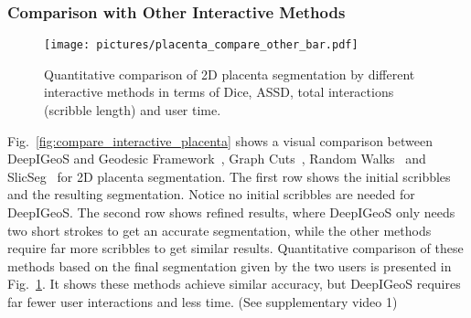 \documentclass[10pt,journal,compsoc]{IEEEtran}
\begin{document}
\subsubsection{Comparison with Other Interactive Methods}


\begin{comment}
\begin{table*}
	\centering
	\small
	\caption{Quantitative evaluation of placenta segmentation by DeepIGeoS and other interactive methods.}
	\label{tab:r-compare_interactive_placenta}
	\begin{tabular}{lllllll}
		\hline
		Method & Dice(\%) & ASSD(pixels) & Scribble(pixels) & User time(s) & Machine time(s)& Iterations\\ \hline
		DeepIGeoS & 91.16$\pm$3.17 & 1.04$\pm$0.33 & 8.33$\pm$5.26&5.31$\pm$3.44 & 0.69$\pm$0.30 & 2.06$\pm$0.64\\
		GeoS       & 86.88$\pm$4.29 & 1.54$\pm$0.49 & 133.32$\pm$46.35 & 18.00$\pm$6.64 & 0.25$\pm$0.22 & 2.65$\pm$1.25\\ 
		
		Graph Cuts        & 88.23$\pm$3.85  & 1.38$\pm$0.38 & 135.09$\pm$45.10 & 21.07$\pm$7.46 & 0.06$\pm$0.04 & 2.86$\pm$1.24\\
		Random Walks & 87.90$\pm$3.46  & 1.40$\pm$0.37 & 163.42$\pm$51.76 & 17.74$\pm$5.31 & 0.11$\pm$0.04 & 2.69$\pm$1.10\\
		SlicSeg  & 88.48$\pm$3.25 & 1.29$\pm$0.32  & 80.59$\pm$24.37 & 13.82$\pm$4.78 & 0.61$\pm$0.37 & 2.04$\pm$0.92\\  
		\hline
	\end{tabular}
\end{table*}
\end{comment}


\begin{figure}[t]
	\centering
	\texttt{[image: pictures/placenta\_compare\_other\_bar.pdf]}
	\caption[Quantitative comparison of 2D placenta segmentation by different interactive methods]{ 
		Quantitative comparison of 2D placenta segmentation by different interactive methods in terms of Dice, ASSD, total interactions (scribble length) and user time.} 
	\label{fig:placenta_compare_other}
\end{figure}
Fig.~\ref{fig:compare_interactive_placenta} shows a visual comparison between DeepIGeoS and Geodesic Framework~\cite{Bai2007}, Graph Cuts~\cite{Boykov2001}, Random Walks~\cite{Grady2006a} and SlicSeg~\cite{Wang2016} for 2D placenta segmentation. The first row shows the initial scribbles and the resulting segmentation. Notice no initial scribbles are needed for DeepIGeoS. The second row shows refined results, where DeepIGeoS only needs two short strokes to get an accurate segmentation, while the other methods require far more scribbles to get similar results. Quantitative comparison of these methods based on the final segmentation given by the two users is presented in Fig.~\ref{fig:placenta_compare_other}. It shows these methods achieve similar accuracy, but DeepIGeoS requires far fewer user interactions and less time. (See supplementary video 1)
\end{document}
